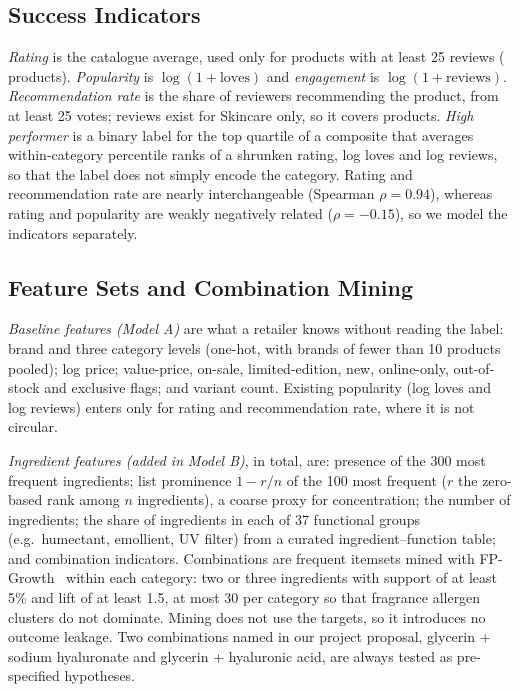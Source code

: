 \documentclass[11pt,a4paper]{article}
\begin{document}
\subsection{Success Indicators}
\emph{Rating} is the catalogue average, used only for products with at least 25 reviews (\NRating{} products). \emph{Popularity} is $\log(1+\text{loves})$ and \emph{engagement} is $\log(1+\text{reviews})$. \emph{Recommendation rate} is the share of reviewers recommending the product, from at least 25 votes; reviews exist for Skincare only, so it covers \NRecRate{} products. \emph{High performer} is a binary label for the top quartile of a composite that averages within-category percentile ranks of a shrunken rating, log loves and log reviews, so that the label does not simply encode the category. Rating and recommendation rate are nearly interchangeable (Spearman $\rho=0.94$), whereas rating and popularity are weakly negatively related ($\rho=-0.15$), so we model the indicators separately.

\subsection{Feature Sets and Combination Mining}
\emph{Baseline features (Model A)} are what a retailer knows without reading the label: brand and three category levels (one-hot, with brands of fewer than 10 products pooled); log price; value-price, on-sale, limited-edition, new, online-only, out-of-stock and exclusive flags; and variant count. Existing popularity (log loves and log reviews) enters only for rating and recommendation rate, where it is not circular.

\emph{Ingredient features (added in Model B)}, \NIngredientFeatures{} in total, are: presence of the 300 most frequent ingredients; list prominence $1-r/n$ of the 100 most frequent ($r$ the zero-based rank among $n$ ingredients), a coarse proxy for concentration; the number of ingredients; the share of ingredients in each of 37 functional groups (e.g.\ humectant, emollient, UV filter) from a curated ingredient--function table; and \NCombinations{} combination indicators. Combinations are frequent itemsets mined with FP-Growth~\cite{han2000fpgrowth} within each category: two or three ingredients with support of at least 5\% and lift of at least 1.5, at most 30 per category so that fragrance allergen clusters do not dominate. Mining does not use the targets, so it introduces no outcome leakage. Two combinations named in our project proposal, glycerin + sodium hyaluronate and glycerin + hyaluronic acid, are always tested as pre-specified hypotheses.
\end{document}
